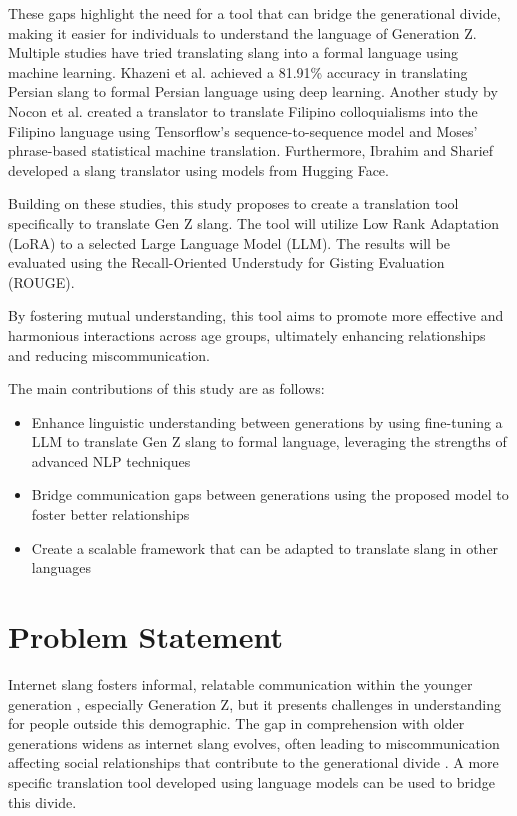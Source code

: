 These gaps highlight the need for a tool that can bridge the generational divide, making it easier for individuals to understand the language of Generation Z. Multiple studies have tried translating slang into a formal language using machine learning. Khazeni et al. achieved a 81.91\% accuracy in translating Persian slang to formal Persian language using deep learning. Another study by Nocon et al. created a translator to translate Filipino colloquialisms into the Filipino language using Tensorflow’s sequence-to-sequence model and Moses’ phrase-based statistical machine translation. Furthermore, Ibrahim and Sharief developed a slang translator using models from Hugging Face. 

Building on these studies, this study proposes to create a translation tool specifically to translate Gen Z slang. The tool will utilize Low Rank Adaptation (LoRA) to a selected Large Language Model (LLM). The results will be evaluated using the Recall-Oriented Understudy for Gisting Evaluation (ROUGE). 

By fostering mutual understanding, this tool aims to promote more effective and harmonious interactions across age groups, ultimately enhancing relationships and reducing miscommunication.

The main contributions of this study are as follows:
\begin{itemize}
    \item Enhance linguistic understanding between generations by using fine-tuning a LLM to translate Gen Z slang to formal language, leveraging the strengths of advanced NLP techniques
    \item Bridge communication gaps between generations using the proposed model to foster better relationships
    \item Create a scalable framework that can be adapted to translate slang in other languages
\end{itemize}

\section{Problem Statement}
\label{sec:problem_statement}

Internet slang fosters informal, relatable communication within the younger generation \cite{Ghazali_Abdullah_2021}, especially Generation Z, but it presents challenges in understanding for people outside this demographic. 
The gap in comprehension with older generations widens as internet slang evolves, often leading to miscommunication affecting social relationships that contribute to the generational divide \cite{Vacalares_Salas_Babac_Cagalawan_Calimpong_2023}. 
A more specific translation tool developed using language models can be used to bridge this divide.

